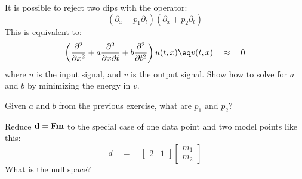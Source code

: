 \begin{exer}
\item It is possible to reject two dips with the operator:
\begin{equation}
(\partial_x + p_1 \partial_t)(\partial_x + p_2 \partial_t)
\end{equation}
This is equivalent to:
\begin{equation}
\left(
\frac{\partial^2}{\partial x^2} + a \frac{\partial^2}{\partial x \partial t} + b \frac{\partial^2}{\partial t^2} 
\right)
u(t,x) \eq v(t,x) \quad \approx \quad 0
\end{equation}
where $u$ is the input signal, and $v$ is the output signal.  Show how to solve for $a$ and $b$ by minimizing the energy in $v$.

\item Given $a$ and $b$ from the previous exercise, what are $p_1$ and $p_2$?

\item
Reduce $\bold d =\bold F\bold m$ to the special case of one data point and two model points like this:
\begin{equation}
d \quad =\quad
\left[
\begin{array}{cc}
2 & 1
\end{array}
\right]
\left[
\begin{array}{c}
m_1
\\
m_2
\end{array}
\right]
\end{equation}
What is the null space?


\end{exer}
